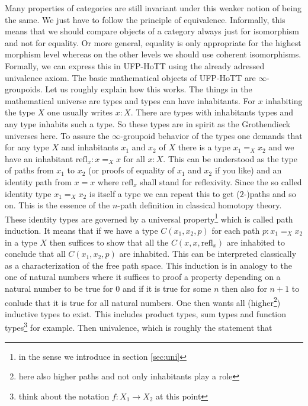 Many properties of categories are still invariant under this weaker notion of being the same. We just have to follow the {\glqq}principle of equivalence{\grqq}. Informally, this means that we should compare objects of a category always just for isomorphism and not for equality. Or more general, equality is only appropriate for the highest morphism level whereas on the other levels we should use coherent isomorphisms. Formally, we can express this in UFP-HoTT using the already adressed univalence axiom. The basic mathematical objects of UFP-HoTT are $\infty$-groupoids. Let us roughly explain how this works. The things in the mathematical universe are types and types can have inhabitants. For $x$ inhabiting the type $X$ one usually writes $x \colon X$. There are types with inhabitants types and any type inhabits such a type. So these types are in spirit as the Grothendieck universes here. To assure the $\infty$-groupoid behavior of the types one demands that for any type $X$ and inhabitants $x_{1}$ and $x_{2}$ of $X$ there is a type $x_{1} =_{X} x_{2}$ and we have an inhabitant $\mathrm{refl}_{x} \colon x =_{X} x$ for all $x \colon X$. This can be understood as the type of paths from $x_{1}$ to $x_{2}$ (or proofs of equality of $x_{1}$ and $x_{2}$ if you like) and an identity path from $x = x$ where $\mathrm{refl}_{x}$ shall stand for reflexivity. Since the so called identity type $x_{1} =_{X} x_{2}$ is itself a type we can repeat this to get ($2$-)paths and so on. This is the essence of the $n$-path definition in classical homotopy theory. These identity types are governed by a universal property\footnote{in the sense we introduce in section \ref{sec:uni}} which is called path induction. It means that if we have a type $C(x_{1},x_{2},p)$ for each path $p \colon x_{1} =_{X} x_{2}$ in a type $X$ then suffices to show that all the $C(x,x,\mathrm{refl}_{x})$ are inhabited to conclude that all $C(x_{1},x_{2},p)$ are inhabited. This can be interpreted classically as a characterization of the free path space. This induction is in analogy to the one of natural numbers where it suffices to proof a property depending on a natural number to be true for $0$ and if it is true for some $n$ then also for $n+1$ to conlude that it is true for all natural numbers. One then wants all (higher\footnote{here also higher paths and not only inhabitants play a role}) inductive types to exist. This includes product types, sum types and function types\footnote{think about the notation $f \colon X_{1} \rightarrow X_{2}$ at this point} for example. Then univalence, which is roughly the statement that
